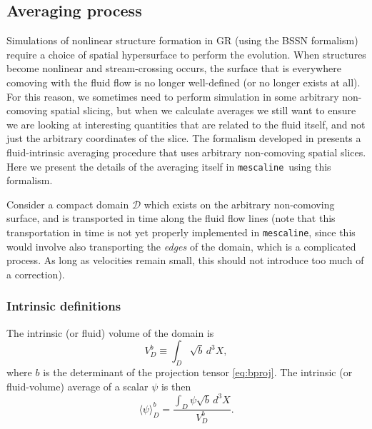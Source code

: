 \documentclass[a4paper]{article}
\newcommand{\mesc}{\texttt{mescaline}}
\begin{document}
\subsection{Averaging process}

Simulations of nonlinear structure formation in GR (using the BSSN formalism) require a choice of spatial hypersurface to perform the evolution. When structures become nonlinear and stream-crossing occurs, the surface that is everywhere comoving with the fluid flow is no longer well-defined (or no longer exists at all). For this reason, we sometimes need to perform simulation in some arbitrary non-comoving spatial slicing, but when we calculate averages we still want to ensure we are looking at interesting quantities that are related to the fluid itself, and not just the arbitrary coordinates of the slice. The formalism developed in \citet{Buchert2020} presents a fluid-intrinsic averaging procedure that uses arbitrary non-comoving spatial slices. Here we present the details of the averaging itself in \mesc\, using this formalism. 

Consider a compact domain $\mathcal{D}$ which exists on the arbitrary non-comoving surface, and is transported in time along the fluid flow lines (note that this transportation in time is not yet properly implemented in \mesc, since this would involve also transporting the \textit{edges} of the domain, which is a complicated process. As long as velocities remain small, this should not introduce too much of a correction). 

\subsubsection{Intrinsic definitions}

The intrinsic (or fluid) volume of the domain is
\begin{equation}
	V^b_D \equiv \int_D \sqrt{b}\, d^3X,
\end{equation}
where $b$ is the determinant of the projection tensor \eqref{eq:bproj}. The intrinsic (or fluid-volume) average of a scalar $\psi$ is then
\begin{equation} \label{eq:avgb}
	\langle\psi\rangle^b_D = \frac{\int_D \psi \sqrt{b}\, d^3 X}{V^b_D}.
\end{equation}
\end{document}
